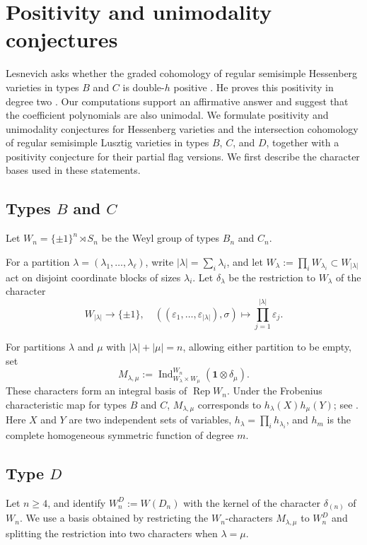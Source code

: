 \documentclass[11pt]{amsart}
\numberwithin{equation}{section}
\theoremstyle{definition}
\def\lra{\longrightarrow }
\DeclareMathOperator{\Rep}{\mathrm{Rep}}
\DeclareMathOperator{\Ind}{\mathrm{Ind}}
\begin{document}
\section{Positivity and unimodality conjectures}
\label{s:positivity}
Lesnevich asks whether the graded cohomology of regular semisimple Hessenberg varieties in types $B$ and $C$ is double-$h$ positive \cite[Question~A.4]{Lesnevich}.
He proves this positivity in degree two \cite[Theorem~8.6 and Table~2]{Lesnevich}.
Our computations support an affirmative answer and suggest that the coefficient polynomials are also unimodal.
We formulate positivity and unimodality conjectures for Hessenberg varieties and the intersection cohomology of regular semisimple Lusztig varieties in types $B$, $C$, and $D$, together with a positivity conjecture for their partial flag versions.
We first describe the character bases used in these statements.

\subsection{Types $B$ and $C$}\label{ss:positivity.BC}

Let $W_n=\{\pm1\}^n\rtimes S_n$ be the Weyl group of types $B_n$ and $C_n$.

For a partition $\lambda=(\lambda_1,\ldots,\lambda_\ell)$, write $|\lambda|=\sum_i\lambda_i$, and let $W_\lambda:=\prod_i W_{\lambda_i}\subset W_{\lvert\lambda\rvert}$ act on disjoint coordinate blocks of sizes $\lambda_i$.
Let $\delta_\lambda$ be the restriction to $W_\lambda$ of the character
\[W_{\lvert\lambda\rvert}\lra \{\pm 1\}, \quad ((\varepsilon_1,\ldots,\varepsilon_{|\lambda|}),\sigma)
\mapsto \prod_{j=1}^{|\lambda|}\varepsilon_j.\]

For partitions $\lambda$ and $\mu$ with $|\lambda|+|\mu|=n$, allowing either partition to be empty, set
\[
M_{\lambda,\mu}
:=
\Ind_{W_\lambda\times W_\mu}^{W_n}
(\mathbf1\otimes\delta_\mu).
\]
These characters form an integral basis of $\Rep W_n$. 
Under the Frobenius characteristic map for types $B$ and $C$, $M_{\lambda,\mu}$ corresponds to $h_\lambda(X)h_\mu(Y)$; see \cite[Appendix~A and Table~2]{Lesnevich}.
Here $X$ and $Y$ are two independent sets of variables, $h_\lambda=\prod_i h_{\lambda_i}$, and $h_m$ is the complete homogeneous symmetric function of degree $m$.


\subsection{Type $D$}\label{ss:positivity.D}
Let $n\geq4$, and identify $W_n^D:=W(D_n)$ with the kernel of the character $\delta_{(n)}$ of $W_n$.
We use a basis obtained by restricting the $W_n$-characters $M_{\lambda,\mu}$ to $W_n^D$ and splitting the restriction into two characters when $\lambda=\mu$.
\end{document}
